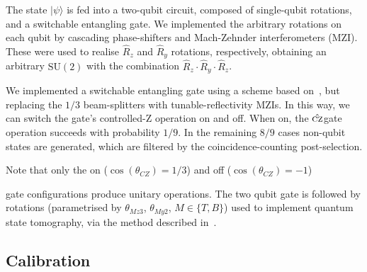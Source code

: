 \documentclass[
twocolumn,
 amsmath,amssymb,
 aps,
  twoside,
 superscriptaddress,
pra,
longbibliography
]{revtex4-1}
\begin{document}
The state $|\psi\rangle$ is fed into a two-qubit circuit, composed of single-qubit rotations, and a switchable entangling gate. We implemented the arbitrary rotations on each qubit by cascading phase-shifters and Mach-Zehnder interferometers (MZI). These were used to realise  $\hat R_z$  and $\hat R_y$ rotations, respectively, obtaining an arbitrary $\mathrm{SU}(2)$ with the combination $\hat R_{z}\cdot \hat R_y \cdot \hat R_{z}$.

We implemented a switchable entangling gate using a scheme based on~\cite{Ralph:2002id}, but replacing the $1/3$ beam-splitters with tunable-reflectivity MZIs. In this way, we can switch the gate's controlled-Z operation on and off. When on, the $\hat{\textsc{cz}}$gate operation succeeds with probability $1/9$. 
In the remaining $8/9$ cases non-qubit states are generated, which are filtered by the coincidence-counting post-selection. 

Note that only the on ($\cos{(\theta_{CZ})} = 1/3$) 
and off ($\cos{(\theta_{CZ})} = -1$) 

gate configurations produce unitary operations. 
The two qubit gate is followed by rotations (parametrised by $\theta_{Mz3}$, $\theta_{My2}$, 
$M\in\{T,B\}$) used to implement quantum state tomography, via the method described in~\cite{James:2001bb}. 


\subsection{Calibration}
\end{document}
